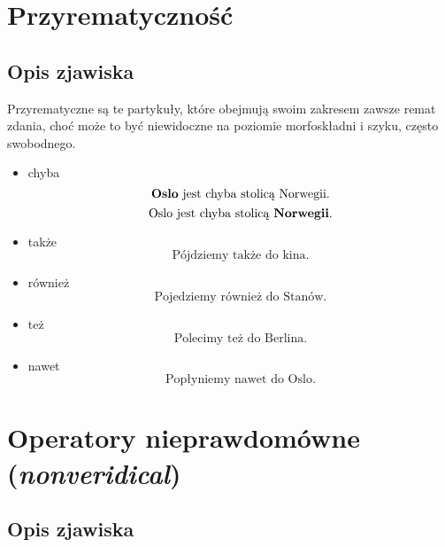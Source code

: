 \documentclass[a4paper, 12pt]{article}
\theoremstyle{remark}
\begin{document}
\section{Przyrematyczność}
{
\renewcommand\thesection{}
\renewcommand\thesubsection{}
\setcounter{subsection}{-1}
\subsection{Opis zjawiska} %
\label{sub:opis_zjawiska2}
}
Przyrematyczne są te partykuły, które obejmują swoim zakresem zawsze remat zdania, choć może to być niewidoczne na poziomie morfoskładni i szyku, często swobodnego.
\begin{itemize}
\item chyba
\begin{equation}
	\text{\textbf{Oslo} jest chyba stolicą Norwegii.}
\end{equation}
\begin{equation}
	\text{Oslo jest chyba stolicą \textbf{Norwegii}.}
\end{equation}
\item także
\begin{equation}
	\text{Pójdziemy także do kina.}
\end{equation}
\item również
\begin{equation}
	\text{Pojedziemy również do Stanów.}
\end{equation}
\item też
\begin{equation}
	\text{Polecimy też do Berlina.}
\end{equation}
\item nawet
\begin{equation}
	\text{Popłyniemy nawet do Oslo.}
\end{equation}


\end{itemize}


\section{Operatory nieprawdomówne (\emph{nonveridical})}
{
\renewcommand\thesection{}
\renewcommand\thesubsection{}
\setcounter{subsection}{-1}
\subsection{Opis zjawiska} %
\label{sub:opis_zjawiska3}
}
\end{document}
